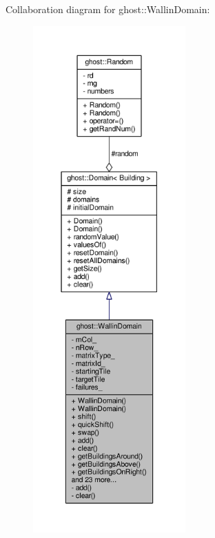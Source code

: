 Collaboration diagram for ghost\-:\-:Wallin\-Domain\-:
\nopagebreak
\begin{figure}[H]
\begin{center}
\leavevmode
\includegraphics[height=550pt]{classghost_1_1WallinDomain__coll__graph}
\end{center}
\end{figure}
